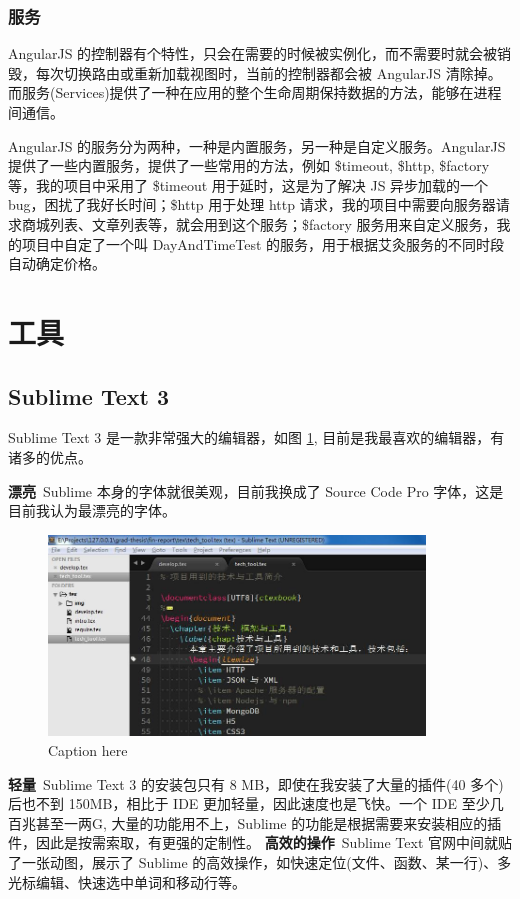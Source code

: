             \subsubsection{服务}
              \label{subsubsec:服务}
                AngularJS 的控制器有个特性，只会在需要的时候被实例化，而不需要时就会被销毁，每次切换路由或重新加载视图时，当前的控制器都会被 AngularJS 清除掉。而服务(Services)提供了一种在应用的整个生命周期保持数据的方法，能够在进程间通信。
                \par
                AngularJS 的服务分为两种，一种是内置服务，另一种是自定义服务。AngularJS 提供了一些内置服务，提供了一些常用的方法，例如
                \$timeout, \$http, \$factory等，我的项目中采用了 \$timeout 用于延时，这是为了解决 JS 异步加载的一个 bug，困扰了我好长时间；\$http 用于处理 http 请求，我的项目中需要向服务器请求商城列表、文章列表等，就会用到这个服务；\$factory 服务用来自定义服务，我的项目中自定了一个叫 DayAndTimeTest 的服务，用于根据艾灸服务的不同时段自动确定价格。

    \section{工具}
      \label{sec:工具}
        \subsection{Sublime Text 3}
          \label{subsec:sublime_text_3}
            Sublime Text 3 是一款非常强大的编辑器，如图 \ref{fig:sublime}, 目前是我最喜欢的编辑器，有诸多的优点。
            \par
            \textbf{漂亮}\, Sublime 本身的字体就很美观，目前我换成了 Source Code Pro 字体，这是目前我认为最漂亮的字体。
            \begin{figure}[H]
              \centering
              \includegraphics[width=10cm]{./img/sublime.jpg}
              \caption{Caption here}
              \label{fig:sublime}
            \end{figure}
            \textbf{轻量}\, Sublime Text 3 的安装包只有 8 MB，即使在我安装了大量的插件(40 多个)后也不到 150MB，相比于 IDE 更加轻量，因此速度也是飞快。一个 IDE 至少几百兆甚至一两G, 大量的功能用不上，Sublime 的功能是根据需要来安装相应的插件，因此是按需索取，有更强的定制性。
            \textbf{高效的操作}\, Sublime Text 官网中间就贴了一张动图，展示了 Sublime 的高效操作，如快速定位(文件、函数、某一行)、多光标编辑、快速选中单词和移动行等。

